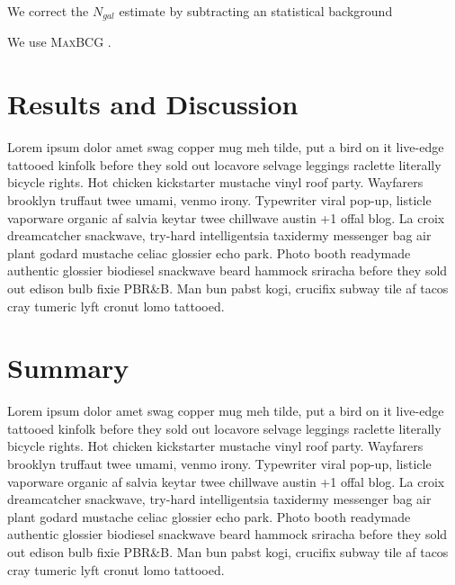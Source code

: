 \documentclass[apj, revtex4]{emulateapj}
\begin{document}
We correct the $N_{gal}$ estimate by subtracting an statistical background 


We use \textsc{MaxBCG} \citep{Koester2007b}.

\section{Results and Discussion}\label{sec:results}

Lorem ipsum dolor amet swag copper mug meh tilde, put a bird on it live-edge tattooed kinfolk before they sold out locavore selvage leggings raclette literally bicycle rights. Hot chicken kickstarter mustache vinyl roof party. Wayfarers brooklyn truffaut twee umami, venmo irony. Typewriter viral pop-up, listicle vaporware organic af salvia keytar twee chillwave austin +1 offal blog. La croix dreamcatcher snackwave, try-hard intelligentsia taxidermy messenger bag air plant godard mustache celiac glossier echo park. Photo booth readymade authentic glossier biodiesel snackwave beard hammock sriracha before they sold out edison bulb fixie PBR\&B. Man bun pabst kogi, crucifix subway tile af tacos cray tumeric lyft cronut lomo tattooed.

\section{Summary}\label{sec:summary}

Lorem ipsum dolor amet swag copper mug meh tilde, put a bird on it live-edge tattooed kinfolk before they sold out locavore selvage leggings raclette literally bicycle rights. Hot chicken kickstarter mustache vinyl roof party. Wayfarers brooklyn truffaut twee umami, venmo irony. Typewriter viral pop-up, listicle vaporware organic af salvia keytar twee chillwave austin +1 offal blog. La croix dreamcatcher snackwave, try-hard intelligentsia taxidermy messenger bag air plant godard mustache celiac glossier echo park. Photo booth readymade authentic glossier biodiesel snackwave beard hammock sriracha before they sold out edison bulb fixie PBR\&B. Man bun pabst kogi, crucifix subway tile af tacos cray tumeric lyft cronut lomo tattooed.
\end{document}
